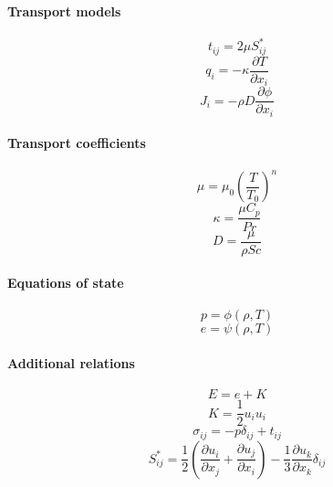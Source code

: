 \documentclass[oneside,a4paper,11pt]{report}
\begin{document}
\paragraph{Transport models} 

\begin{equation*}
    t_{ij} = 2\mu S_{ij}^*
\end{equation*}
\begin{equation*}
    q_i = -\kappa \frac{\partial T}{\partial x_i}
\end{equation*}
\begin{equation*}
    J_i = -\rho D \frac{\partial \phi}{\partial x_i}
\end{equation*}

\paragraph{Transport coefficients}

\begin{equation*}
    \mu = \mu_0 \left ( \frac{T}{T_0} \right )^n
\end{equation*}
\begin{equation*}
    \kappa = \frac{\mu C_p}{Pr}
\end{equation*}
\begin{equation*}
    D = \frac{\mu}{\rho Sc}
\end{equation*}

\paragraph{Equations of state}

\begin{equation*}
    p = \phi (\rho, T)
\end{equation*}
\begin{equation*}
    e = \psi (\rho, T)
\end{equation*}

\paragraph{Additional relations}

\begin{equation*}
    E = e + K
\end{equation*}
\begin{equation*}
    K = \frac{1}{2} u_i u_i
\end{equation*}
\begin{equation*}
    \sigma_{ij} = -p \delta_{ij} + t_{ij}
\end{equation*}
\begin{equation*}
    S^*_{ij} = \frac{1}{2} \left ( \frac{\partial u_i}{\partial x_j} + \frac{\partial u_j}{\partial x_i} \right ) - \frac{1}{3} \frac{\partial u_k}{\partial x_k} \delta_{ij}
\end{equation*}
\end{document}
